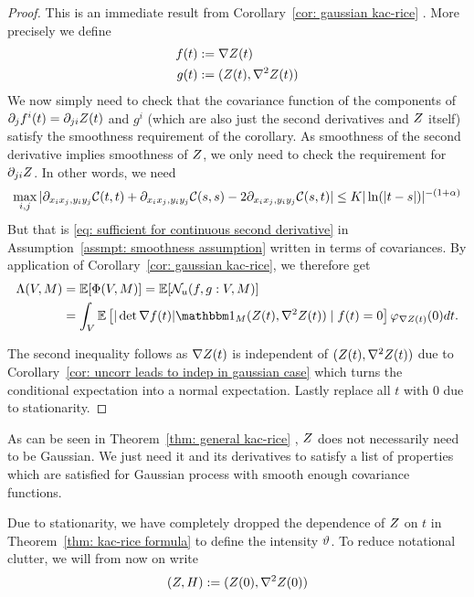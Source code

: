 \begin{proof}
	This is an immediate result from Corollary~\ref{cor: gaussian kac-rice}
	\parencite[Corollary~11.2.2]{adlerRandomFieldsGeometry2007}. More precisely
	we define
	\begin{align*}
		f(t) &:= \nabla Z(t)\\
		g(t) &:= (Z(t), \nabla^2 Z(t))
	\end{align*}
	We now simply need to check that the covariance function of the components of
	\(\partial_j f^i(t) = \partial_{ji} Z(t)\) and \(g^i\) (which are
	also just the second derivatives and \(Z\) itself) satisfy the smoothness
	requirement of the corollary. As smoothness of the second derivative implies
	smoothness of \(Z\), we only need to check the requirement for \(\partial_{ji} Z\).
	In other words, we need
	\[
		\max_{i,j}|\partial_{x_i x_j, y_i y_j}\mathcal{C}(t,t)
		+ \partial_{x_i x_j, y_i y_j}\mathcal{C}(s,s)
		-2\partial_{x_i x_j, y_i y_j}\mathcal{C}(s,t)| \le K |\ln(|t-s|)|^{-(1+\alpha)}
	\]
	But that is \eqref{eq: sufficient for continuous second derivative} in
	Assumption~\ref{assmpt: smoothness assumption} written in terms of
	covariances. By application
	of Corollary~\ref{cor: gaussian kac-rice}, we therefore get
	\begin{align*}
		\intensityMeas(\Vol, M) 
		&= \E[\pp(\Vol, M)]
		= \E[\level(f, g: \Vol, M)]\\
		&= \int_\Vol \E\left[
			|\det \nabla f(t)| \ind_M(\rf(t), \nabla^2\rf(t)) \mid f(t) = 0
		\right] \density_{\nabla\rf(t)}(0)dt.
	\end{align*}
	
	
	The second inequality follows as \(\nabla Z(t)\) is independent of
	\((Z(t),\nabla^2Z(t))\) due to Corollary~\ref{cor: uncorr leads to indep
	in gaussian case} which turns the conditional expectation into a normal
	expectation. Lastly replace all \(t\) with \(0\) due to stationarity.
\end{proof}
\begin{remark}
	As can be seen in Theorem~\ref{thm: general kac-rice} \parencite[Theorem
	11.2.1]{adlerRandomFieldsGeometry2007}, \(Z\) does not necessarily
	need to be Gaussian. We just need it and its derivatives to satisfy a
	list of properties which are satisfied for Gaussian process with
	smooth enough covariance functions.
\end{remark}

Due to stationarity, we have completely dropped the dependence of \(Z\) on
\(t\) in Theorem~\ref{thm: kac-rice formula} to define the intensity
\(\vartheta\). To reduce notational clutter, we will from now on write
\[
	(Z,H):= (Z(0), \nabla^2Z(0))
\]

